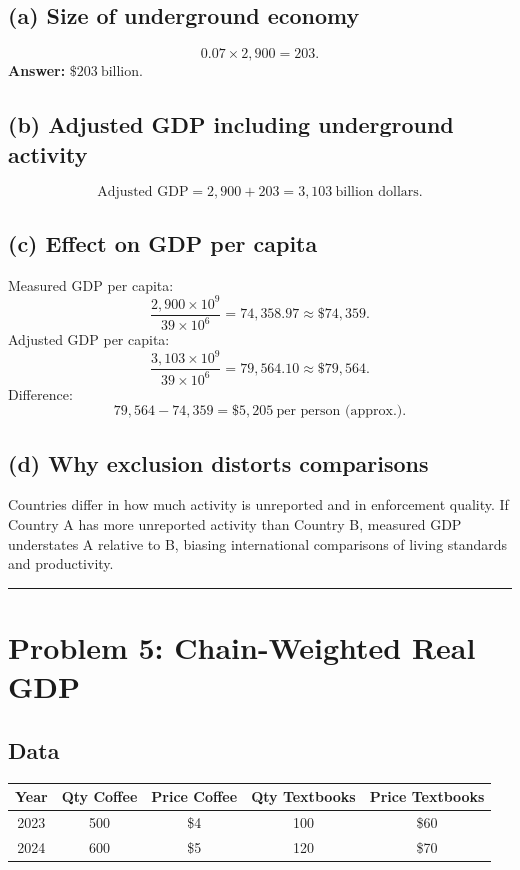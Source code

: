 \documentclass[11pt]{article}
\begin{document}
\subsection*{(a) Size of underground economy}
\[
0.07 \times 2{,}900 = 203.
\]
\textbf{Answer:} \(\boxed{\$203\ \text{billion}}\).

\subsection*{(b) Adjusted GDP including underground activity}
\[
\text{Adjusted GDP} = 2{,}900 + 203 = \boxed{3{,}103\ \text{billion dollars}}.
\]

\subsection*{(c) Effect on GDP per capita}
Measured GDP per capita:
\[
\frac{2{,}900\times 10^9}{39\times 10^6} = 74{,}358.97 \approx \$74{,}359.
\]
Adjusted GDP per capita:
\[
\frac{3{,}103\times 10^9}{39\times 10^6} = 79{,}564.10 \approx \$79{,}564.
\]
Difference:
\[
79{,}564 - 74{,}359 = \boxed{\$5{,}205\ \text{per person (approx.)}}.
\]

\subsection*{(d) Why exclusion distorts comparisons}
Countries differ in how much activity is unreported and in enforcement quality. If Country A has more unreported activity than Country B, measured GDP understates A relative to B, biasing international comparisons of living standards and productivity.

\bigskip
\hrule
\bigskip

\section*{Problem 5: Chain-Weighted Real GDP}

\subsection*{Data}
\begin{center}
\begin{tabular}{c c c c c}
\toprule
Year & Qty Coffee & Price Coffee & Qty Textbooks & Price Textbooks \\
\midrule
2023 & 500 & \$4 & 100 & \$60 \\
2024 & 600 & \$5 & 120 & \$70 \\
\bottomrule
\end{tabular}
\end{center}
\end{document}
